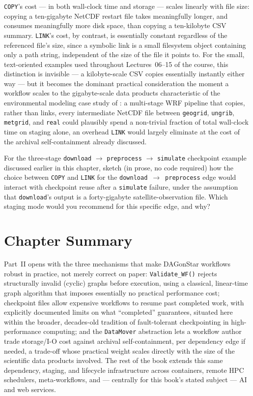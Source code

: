 \texttt{COPY}'s cost --- in both wall-clock time and storage --- scales
linearly with file size: copying a ten-gigabyte NetCDF restart file takes
meaningfully longer, and consumes meaningfully more disk space, than copying
a ten-kilobyte CSV summary. \texttt{LINK}'s cost, by contrast, is
essentially constant regardless of the referenced file's size, since a
symbolic link is a small filesystem object containing only a path string,
independent of the size of the file it points to. For the small,
text-oriented examples used throughout Lectures~06--15 of the course, this
distinction is invisible --- a kilobyte-scale CSV copies essentially
instantly either way --- but it becomes the dominant practical
consideration the moment a workflow scales to the gigabyte-scale data
products characteristic of the environmental modeling case study of
: a multi-stage WRF pipeline that copies, rather than
links, every intermediate NetCDF file between \texttt{geogrid},
\texttt{ungrib}, \texttt{metgrid}, and \texttt{real} could plausibly spend
a non-trivial fraction of total wall-clock time on staging alone, an
overhead \texttt{LINK} would largely eliminate at the cost of the
archival self-containment  already discussed.

\begin{exercise}
For the three-stage \texttt{download} $\to$ \texttt{preprocess} $\to$
\texttt{simulate} checkpoint example discussed earlier in this chapter,
sketch (in prose, no code required) how the choice between \texttt{COPY} and
\texttt{LINK} for the \texttt{download}~$\to$~\texttt{preprocess} edge would
interact with checkpoint reuse after a \texttt{simulate} failure, under the
assumption that \texttt{download}'s output is a forty-gigabyte
satellite-observation file. Which staging mode would you recommend for this
specific edge, and why?
\end{exercise}

\section{Chapter Summary}

Part~II opens with the three mechanisms that make DAGonStar workflows robust
in practice, not merely correct on paper: \texttt{Validate\_WF()} rejects
structurally invalid (cyclic) graphs before execution, using a classical,
linear-time graph algorithm that imposes essentially no practical
performance cost; checkpoint files allow expensive workflows to resume past
completed work, with explicitly documented limits on what ``completed''
guarantees, situated here within the broader, decades-old tradition of
fault-tolerant checkpointing in high-performance computing; and the
\texttt{DataMover} abstraction lets a workflow author trade storage/I-O cost
against archival self-containment, per dependency edge if needed, a
trade-off whose practical weight scales directly with the size of the
scientific data products involved. The rest of the book extends this same
dependency, staging, and lifecycle infrastructure across containers, remote
HPC schedulers, meta-workflows, and --- centrally for this book's stated
subject --- AI and web services.
